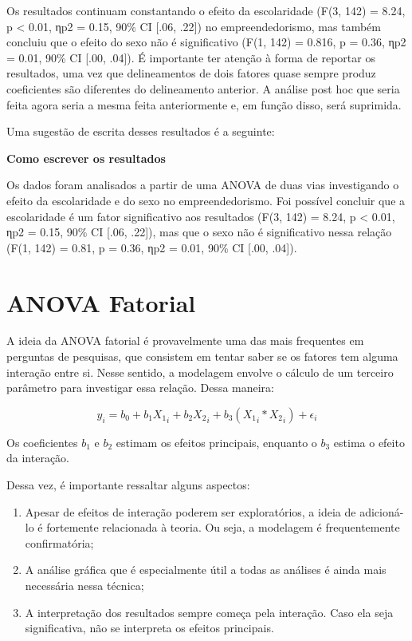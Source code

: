 \documentclass[
]{book}
\begin{document}
Os resultados continuam constantando o efeito da escolaridade (F(3, 142) = 8.24, p \textless{} 0.01, ηp2 = 0.15, 90\% CI {[}.06, .22{]}) no empreendedorismo, mas também concluiu que o efeito do sexo não é significativo (F(1, 142) = 0.816, p = 0.36, ηp2 = 0.01, 90\% CI {[}.00, .04{]}). É importante ter atenção à forma de reportar os resultados, uma vez que delineamentos de dois fatores quase sempre produz coeficientes são diferentes do delineamento anterior. A análise post hoc que seria feita agora seria a mesma feita anteriormente e, em função disso, será suprimida.

Uma sugestão de escrita desses resultados é a seguinte:

\begin{writing}
\textbf{Como escrever os resultados}

Os dados foram analisados a partir de uma ANOVA de duas vias
investigando o efeito da escolaridade e do sexo no empreendedorismo. Foi
possível concluir que a escolaridade é um fator significativo aos
resultados (F(3, 142) = 8.24, p \textless{} 0.01, ηp2 = 0.15, 90\% CI
{[}.06, .22{]}), mas que o sexo não é significativo nessa relação (F(1,
142) = 0.81, p = 0.36, ηp2 = 0.01, 90\% CI {[}.00, .04{]}).
\end{writing}

\hypertarget{anova-fatorial}{%
\section{ANOVA Fatorial}\label{anova-fatorial}}

A ideia da ANOVA fatorial é provavelmente uma das mais frequentes em perguntas de pesquisas, que consistem em tentar saber se os fatores tem alguma interação entre si. Nesse sentido, a modelagem envolve o cálculo de um terceiro parâmetro para investigar essa relação. Dessa maneira:

\[y_i = b_0 + b_1X{_1}_i + b_2X{_2}_i + b_3(X{_1}_i * X{_2}_i) + \epsilon_{i}\]

Os coeficientes \(b_1\) e \(b_2\) estimam os efeitos principais, enquanto o \(b_3\) estima o efeito da interação.

Dessa vez, é importante ressaltar alguns aspectos:

\begin{enumerate}
\def\labelenumi{\arabic{enumi}.}
\item
  Apesar de efeitos de interação poderem ser exploratórios, a ideia de adicioná-lo é fortemente relacionada à teoria. Ou seja, a modelagem é frequentemente confirmatória;
\item
  A análise gráfica que é especialmente útil a todas as análises é ainda mais necessária nessa técnica;
\item
  A interpretação dos resultados sempre começa pela interação. Caso ela seja significativa, não se interpreta os efeitos principais.
\end{enumerate}
\end{document}
